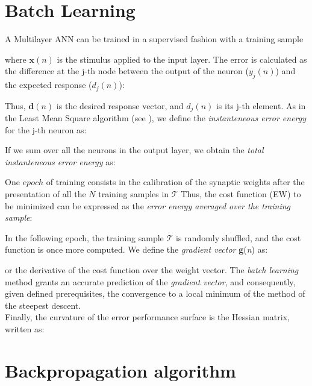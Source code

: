 
\section{Batch Learning}
\label{sec:batchlearning}

A Multilayer \acs{ANN} can be trained in a supervised fashion with a training
sample

where $\mathbf{x}(n)$ is the stimulus applied to the input layer.
The error is calculated 
as the difference at the j-th
node between the output of the neuron ($y_j(n)$) and the expected response
($d_j(n)$):

Thus, $\mathbf{d}(n)$ is the desired response vector, and $d_j(n)$ is its j-th
element.
As in the Least Mean Square algorithm (see \citet{RefWorks:158}), we define
the \textit{instanteneous error energy} for the j-th neuron as:

If we sum over all the neurons in the output layer, we obtain
the \textit{total instanteneous error energy} as:

One $epoch$ of training consists in the calibration of the synaptic weights
after the presentation of all the $N$ training samples in $\mathscr{T}$
Thus,
the cost function (\acs{EW}) to be minimized can be
expressed as the \textit{error energy averaged over the training sample}:

In the following epoch, the training sample $\mathscr{T}$ is randomly shuffled,
and the cost function is once more computed.
We define the \textit{gradient vector}
\textbf{g}(\textit{n}) as:

or the derivative of the cost function over the  weight vector.
The \textit{batch learning} method grants an accurate prediction of the
\textit{gradient vector}, and consequently, given defined prerequisites, the
convergence to a local minimum of the method of the steepest descent.\\
Finally, the curvature of the error performance surface is the Hessian matrix,
written as:


\section{Backpropagation algorithm}
\label{sec:backpropagationalgorithm}

